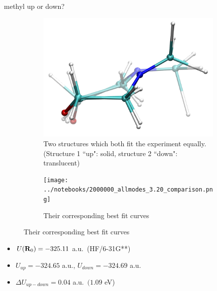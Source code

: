 \documentclass{beamer}
\begin{document}
\begin{frame}{methyl up or down?}
	\vspace{-5mm}
	\begin{figure}
		\centering
		\begin{subfigure}[b]{0.45\textwidth}
			\centering
			\includegraphics[width=\textwidth]{allmodes_1m_2m_frame71_comparison.png}
			\caption{Two structures which both fit the experiment equally. (Structure 1 ``up": solid, structure 2 ``down": translucent)}
		\end{subfigure}
		\begin{subfigure}[b]{0.45\textwidth}
			\centering
			\texttt{[image: ../notebooks/2000000\_allmodes\_3.20\_comparison.png]}
			\caption{Their corresponding best fit curves}
		\end{subfigure}
	\end{figure}
	\begin{itemize}
		\item $U({\bf R}_0)=-325.11$ a.u.\ (HF/6-31G**)
		\item $U_{up}=-324.65$ a.u., $U_{down}=-324.69$ a.u.
		\item $\Delta U_{up-down} = 0.04$ a.u.\ $(1.09$ eV)
	\end{itemize}

\end{frame}
\end{document}
